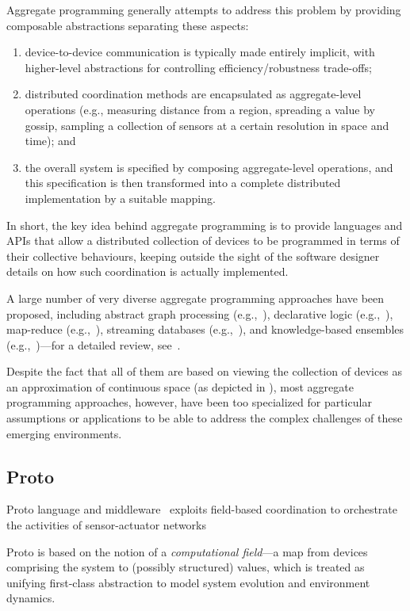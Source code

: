 \documentclass[12pt,a4paper,twoside,openright]{book}
\begin{document}
Aggregate programming generally attempts to address this problem by providing composable abstractions separating these aspects:
\begin{enumerate}
 \item device-to-device communication is typically made entirely implicit, with higher-level abstractions for controlling efficiency/robustness trade-offs;
 \item distributed coordination methods are encapsulated as aggregate-level operations (e.g., measuring distance from a region, spreading a value by gossip, sampling a collection of sensors at a certain resolution in space and time); and
 \item the overall system is specified by composing aggregate-level operations, and this specification is then transformed into a complete distributed implementation by a suitable mapping.
\end{enumerate}

In short, the key idea behind aggregate programming is to provide languages and APIs that allow a distributed collection of devices to be programmed in terms of their collective behaviours, keeping outside the sight of the software designer details on how such coordination is actually implemented.

A large number of very diverse aggregate programming approaches have been proposed, including abstract graph processing (e.g.,~\cite{kairos}), declarative logic (e.g.,~\cite{Meld}), map-reduce (e.g.,~\cite{dean2008mapreduce}), streaming databases (e.g.,~\cite{tinydb}), and knowledge-based ensembles (e.g.,~\cite{SCEL})---for a detailed review, see~\cite{SpatialIGI2013}.

Despite the fact that all of them are based on viewing the collection of devices as an approximation of continuous space (as depicted in ), most aggregate programming approaches, however, have been too specialized for particular assumptions or applications to be able to address the complex challenges of these emerging environments.

\subsection{Proto}
\label{proto}

Proto language and middleware~\cite{proto} exploits field-based coordination to orchestrate the activities of sensor-actuator networks

Proto is based on the notion of a {\em computational field}---a map from devices comprising the system to (possibly structured) values, which is treated as unifying first-class abstraction to model system evolution and environment dynamics.
\end{document}
